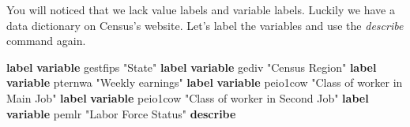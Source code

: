 \documentclass[
]{book}
\newenvironment{Shaded}{\begin{snugshade}}{\end{snugshade}}
\newcommand{\KeywordTok}[1]{\textcolor[rgb]{0.13,0.29,0.53}{\textbf{#1}}}
\newcommand{\NormalTok}[1]{#1}
\newcommand{\StringTok}[1]{\textcolor[rgb]{0.31,0.60,0.02}{#1}}
\begin{document}
You will noticed that we lack value labels and variable labels. Luckily we have a data dictionary on Census's website. Let's label the variables and use the \emph{describe} command again.

\begin{Shaded}
\begin{Highlighting}[]
\KeywordTok{label} \KeywordTok{variable}\NormalTok{ gestfips }\StringTok{"State"}
\KeywordTok{label} \KeywordTok{variable}\NormalTok{ gediv }\StringTok{"Census Region"}
\KeywordTok{label} \KeywordTok{variable}\NormalTok{ pternwa }\StringTok{"Weekly earnings"}
\KeywordTok{label} \KeywordTok{variable}\NormalTok{ peio1cow }\StringTok{"Class of worker in Main Job"}
\KeywordTok{label} \KeywordTok{variable}\NormalTok{ peio1cow }\StringTok{"Class of worker in Second Job"}
\KeywordTok{label} \KeywordTok{variable}\NormalTok{ pemlr }\StringTok{"Labor Force Status"}
\KeywordTok{describe}
\end{Highlighting}
\end{Shaded}
\end{document}
